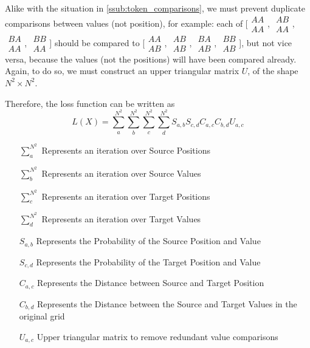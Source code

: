 Alike with the situation in \autoref{ssub:token_comparisons}, we must prevent duplicate comparisons between values (not position), for example: each of %
[$\begin{smallmatrix}AA\\AA\end{smallmatrix}$,%
$\begin{smallmatrix}AB\\AA\end{smallmatrix}$,%
$\begin{smallmatrix}BA\\AA\end{smallmatrix}$,%
$\begin{smallmatrix}BB\\AA\end{smallmatrix}$] should be compared to
[$\begin{smallmatrix}AA\\AB\end{smallmatrix}$,%
$\begin{smallmatrix}AB\\AB\end{smallmatrix}$,%
$\begin{smallmatrix}BA\\AB\end{smallmatrix}$,%
$\begin{smallmatrix}BB\\AB\end{smallmatrix}$], but not vice versa, because the values (not the positions) will have been compared already. Again, to do so, we must construct an upper triangular matrix $U$, of the shape $N^2\times N^2$.

Therefore, the loss function can be written as
\begin{equation}
    L(X)=\sum_{a}^{N^2} \sum_{b}^{N^2} \sum_{c}^{N^2} \sum_{d}^{N^2} S_{a,b} S_{c,d} C_{a,c}C_{b,d}U_{a,c}
\end{equation}

\begin{itemize}
    \item [$\sum_{a}^{N^2}$] Represents an iteration over Source Positions
    \item [$\sum_{b}^{N^2}$] Represents an iteration over Source Values
    \item [$\sum_{c}^{N^2}$] Represents an iteration over Target Positions
    \item [$\sum_{d}^{N^2}$] Represents an iteration over Target Values
    \item [$S_{a,b}$] Represents the Probability of the Source Position and Value
    \item [$S_{c,d}$] Represents the Probability of the Target Position and Value
    \item [$C_{a,c}$] Represents the Distance between Source and Target Position
    \item [$C_{b,d}$] Represents the Distance between the Source and Target Values in the original grid
    \item [$U_{a,c}$] Upper triangular matrix to remove redundant value comparisons
\end{itemize}
